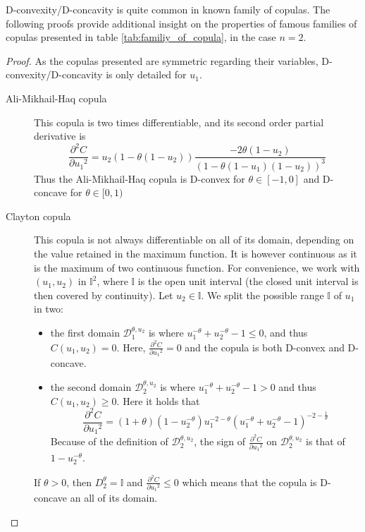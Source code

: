 D-convexity/D-concavity is quite common in known family of copulas. The following proofs provide additional insight on the properties of famous families of copulas presented in table \ref{tab:familiy_of_copula}, in the case $n=2$.
\begin{proof}
    As the copulas presented are symmetric regarding their variables, D-convexity/D-concavity is only detailed for $u_1$.

    \begin{description}
        \item[Ali-Mikhail-Haq copula] This copula is two times differentiable, and its second order partial derivative is
        $$\frac{\partial^2 C}{\partial {u_1}^2}=u_2(1-\theta(1-u_2))\frac{-2\theta(1-u_2)}{(1-\theta(1-u_1)(1-u_2))^3}$$
        Thus the Ali-Mikhail-Haq copula is D-convex for $\theta\in[-1,0]$ and D-concave for $\theta\in[0,1)$
        \item[Clayton copula] This copula is not always differentiable on all of its domain, depending on the value retained in the maximum function. It is however continuous as it is the maximum of two continuous function. For convenience, we work with $(u_1, u_2)$ in $\mathbb{I}^2$, where $\mathbb{I}$ is the open unit interval (the closed unit interval is then covered by continuity). Let $u_2\in\mathbb{I}$. We split the possible range $\mathbb{I}$ of $u_1$ in two:
    \begin{itemize}
        \item the first domain $\mathcal{D}_1^{\theta,u_2}$ is where $u_1^{-\theta}+u_2^{-\theta}-1\leqslant0$, and thus $C(u_1, u_2)=0$. Here, $\frac{\partial^2 C}{\partial {u_1}^2}=0$ and the copula is both D-convex and D-concave.
        \item the second domain $\mathcal{D}_2^{\theta,u_2}$ is where $u_1^{-\theta}+u_2^{-\theta}-1>0$ and thus $C(u_1, u_2)\geqslant0$. Here it holds that
        $$\frac{\partial^2 C}{\partial {u_1}^2}=(1+\theta)(1-u_2^{-\theta})u_1^{-2-\theta}(u_1^{-\theta}+u_2^{-\theta}-1)^{-2-\frac{1}{\theta}}$$
        Because of the definition of $\mathcal{D}_2^{\theta,u_2}$, the sign of $\frac{\partial^2 C}{\partial {u_1}^2}$ on $\mathcal{D}_2^{\theta,u_2}$ is that of $1-u_2^{-\theta}$.
    \end{itemize}
    
    If $\theta>0$, then $D^\theta_2=\mathbb{I}$ and $\frac{\partial^2 C}{\partial {u_1}^2}\leqslant0$ which means that the copula is D-concave an all of its domain.


\end{description}
\end{proof}
